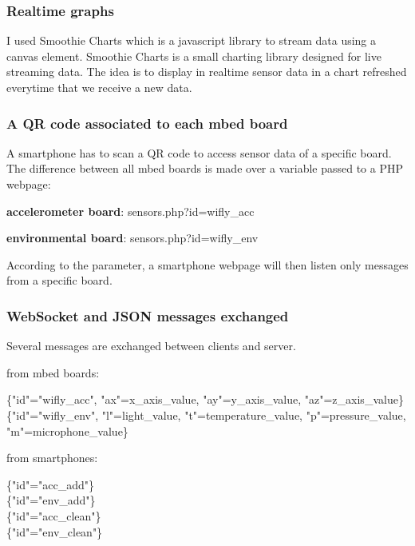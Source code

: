 \documentclass[pdftex,10pt,a4paper]{report}
\newenvironment{packed_item}{
\begin{itemize}
  \setlength{\itemsep}{1pt}
  \setlength{\parskip}{0pt}
  \setlength{\parsep}{0pt}
}{\end{itemize}}
\begin{document}
\subsubsection{Realtime graphs}
I used Smoothie Charts which is a javascript library to stream data using a canvas element. Smoothie Charts is a small charting library designed for live streaming data. The idea is to display in realtime sensor data in a chart refreshed everytime that we receive a new data.

\subsubsection{A QR code associated to each mbed board}
A smartphone has to scan a QR code to access sensor data of a specific board. The difference between all mbed boards is made over a variable passed to a PHP webpage:
\begin{packed_item}
	\item \textbf{accelerometer board}: sensors.php?id=wifly\_acc
	\item \textbf{environmental board}: sensors.php?id=wifly\_env
\end{packed_item}

According to the parameter, a smartphone webpage will then listen only messages from a specific board.

\subsubsection{WebSocket and JSON messages exchanged}
Several messages are exchanged between clients and server. 
\begin{packed_item}
	\item from mbed boards: 
		\begin{center}
				\{"id"="wifly\_acc", "ax"=x\_axis\_value, "ay"=y\_axis\_value, "az"=z\_axis\_value\} \\
				\{"id"="wifly\_env", "l"=light\_value, "t"=temperature\_value, "p"=pressure\_value, "m"=microphone\_value\}
		\end{center}
	\item from smartphones:
		\begin{center}
				\{"id"="acc\_add"\} \\
				\{"id"="env\_add"\} \\
				\{"id"="acc\_clean"\} \\
				\{"id"="env\_clean"\}
		\end{center}
		
\end{packed_item}
\end{document}
